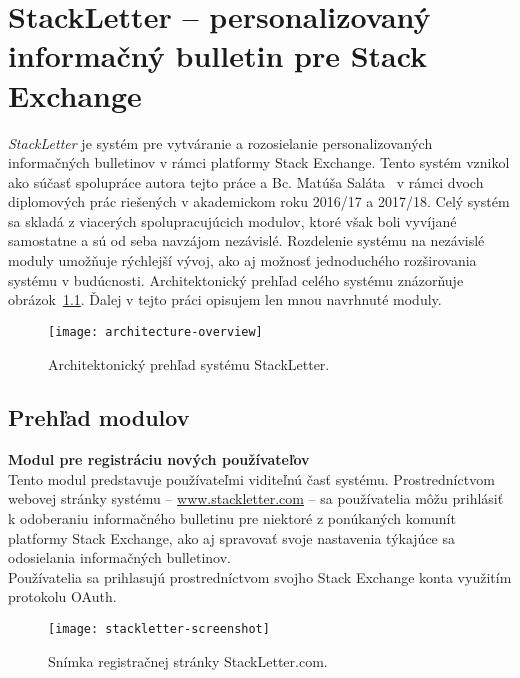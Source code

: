 \afterpage{\blankpage}
\newpage
\chapter{StackLetter -- personalizovaný informačný bulletin pre Stack Exchange}

\textit{StackLetter} je systém pre vytváranie a rozosielanie personalizovaných informačných bulletinov v rámci platformy
Stack Exchange. Tento systém vznikol ako súčasť spolupráce autora tejto práce a Bc. Matúša Saláta~\cite{Salat2018} v rámci
dvoch diplomových prác riešených v akademickom roku 2016/17 a 2017/18. Celý systém sa skladá
z viacerých spolupracujúcich modulov, ktoré však boli vyvíjané samostatne a sú od seba navzájom nezávislé. Rozdelenie
systému na nezávislé moduly umožňuje rýchlejší vývoj, ako aj možnosť jednoduchého rozširovania systému v budúcnosti.
Architektonický prehľad celého systému znázorňuje obrázok~\ref{fig:architecutre-overview}. Ďalej v tejto práci opisujem
len mnou navrhnuté moduly.

\begin{figure}[H]\begin{center}
\texttt{[image: architecture-overview]}
\caption{Architektonický prehľad systému StackLetter. \label{fig:architecutre-overview}}\end{center}
\end{figure}

\section{Prehľad modulov}

\textbf{Modul pre registráciu nových používateľov}\\
Tento modul predstavuje používateľmi viditeľnú časť systému. Prostredníctvom webovej stránky systému
-- \url{www.stackletter.com} -- sa používatelia môžu prihlásiť k odoberaniu informačného bulletinu pre niektoré
z ponúkaných komunít platformy Stack Exchange, ako aj spravovať svoje nastavenia týkajúce sa odosielania informačných
bulletinov.\\
Používatelia sa prihlasujú prostredníctvom svojho Stack Exchange konta využitím protokolu OAuth.

\begin{figure}[H]\begin{center}
\texttt{[image: stackletter-screenshot]}
\caption{Snímka registračnej stránky StackLetter.com. \label{fig:stackletter.com}}\end{center}
\end{figure}

